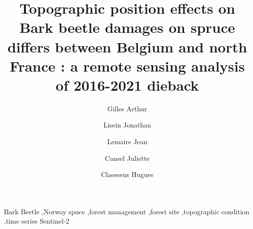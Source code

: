 \documentclass[3p,procedia]{elsarticle}
\begin{document}
\begin{frontmatter}

\author[label2]{Gilles Arthur}
\author[label2]{Lisein Jonathan}
\author[label3]{Lemaire Jean}
\author[label3]{Cansel Juliette}
\author[label2]{Claessens Hugues}



\title{Topographic position effects on Bark beetle damages on spruce differs between Belgium and north France : a remote sensing analysis of 2016-2021 dieback}

\begin{abstract}
	

\end{abstract}

\begin{keyword}
Bark Beetle \sep Norway spuce \sep forest management \sep forest site \sep topographic condition \sep time series Sentinel-2
\end{keyword}

\end{frontmatter}
\end{document}

